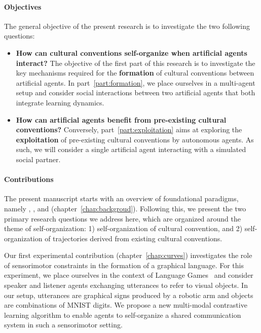 \paragraph{Objectives}

The general objective of the present research is to investigate the two following questions: 
\begin{itemize}
	\item \textbf{How can cultural conventions self-organize when artificial agents interact?} The objective of the first part of this research is to investigate the key mechanisms required for the \textbf{formation} of cultural conventions between artificial agents. In part~\ref{part:formation}, we place ourselves in a multi-agent setup and consider social interactions between two artificial agents that both integrate learning dynamics. 
	\item \textbf{How can artificial agents benefit from pre-existing cultural conventions?} Conversely, part~\ref{part:exploitation} aims at exploring the \textbf{exploitation} of pre-existing cultural conventions by autonomous agents. As such, we will consider a single artificial agent interacting with a simulated social partner.
\end{itemize}


\paragraph{Contributions}

The present manuscript starts with an overview of foundational \ai paradigms, namely \rl, \il, and \marl (chapter~\ref{chap:backgroud}). Following this, we present the two primary research questions we address here, which are organized around the theme of self-organization: 1) self-organization of cultural convention, and 2) self-organization of trajectories derived from existing cultural conventions.

Our first experimental contribution (chapter~\ref{chap:curves}) investigates the role of sensorimotor constraints in the formation of a graphical language. For this experiment, we place ourselves in the context of Language Games~\citep{steels2001language} and consider speaker and listener agents exchanging utterances to refer to visual objects. In our setup,  utterances are graphical signs produced by a robotic arm and objects are combinations of MNIST digits. We propose a new multi-modal contrastive learning algorithm to enable agents to self-organize a shared communication system in such a sensorimotor setting.

